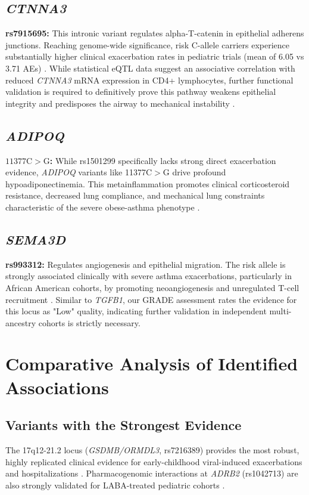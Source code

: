 \documentclass[11pt,a4paper]{article}
\begin{document}
\subsection{\textit{CTNNA3}}
\textbf{rs7915695:} This intronic variant regulates alpha-T-catenin in epithelial adherens junctions. Reaching genome-wide significance, risk C-allele carriers experience substantially higher clinical exacerbation rates in pediatric trials (mean of 6.05 vs 3.71 AEs) \cite{McGeachieWu2015}. While statistical eQTL data suggest an associative correlation with reduced \textit{CTNNA3} mRNA expression in CD4+ lymphocytes, further functional validation is required to definitively prove this pathway weakens epithelial integrity and predisposes the airway to mechanical instability \cite{McGeachieWu2015}.

\subsection{\textit{ADIPOQ}}
\textbf{$11377\text{C}>\text{G}$:} While rs1501299 specifically lacks strong direct exacerbation evidence, \textit{ADIPOQ} variants like 11377C$>$G drive profound hypoadiponectinemia. This metainflammation promotes clinical corticosteroid resistance, decreased lung compliance, and mechanical lung constraints characteristic of the severe obese-asthma phenotype \cite{GajewskaKuryowicz2016, PetersDixon2018, OlejnikKunarKamiska2024}.

\subsection{\textit{SEMA3D}}
\textbf{rs993312:} Regulates angiogenesis and epithelial migration. The risk allele is strongly associated clinically with severe asthma exacerbations, particularly in African American cohorts, by promoting neoangiogenesis and unregulated T-cell recruitment \cite{McGeachieWu2015, RanjbarWhetstone2022}. Similar to \textit{TGFB1}, our GRADE assessment rates the evidence for this locus as "Low" quality, indicating further validation in independent multi-ancestry cohorts is strictly necessary.

\section{Comparative Analysis of Identified Associations}

\subsection{Variants with the Strongest Evidence}
The 17q12-21.2 locus (\textit{GSDMB/ORMDL3}, rs7216389) provides the most robust, highly replicated clinical evidence for early-childhood viral-induced exacerbations and hospitalizations \cite{SchoettlerDissanayake2022, ZhuLiu2025, VoorhiesMohammed2024}. Pharmacogenomic interactions at \textit{ADRB2} (rs1042713) are also strongly validated for LABA-treated pediatric cohorts \cite{SlobVijverberg2024, KarimiVijverberg2021}.
\end{document}
